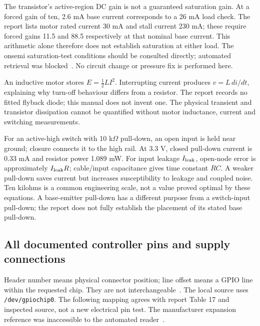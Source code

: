 The transistor's active-region DC gain is not a guaranteed saturation gain.
At a forced gain of ten, 2.6 mA base current corresponds to a 26 mA load
check. The report lists motor rated current 30 mA and stall current 230 mA;
these require forced gains 11.5 and 88.5 respectively at that nominal base
current. This arithmetic alone therefore does not establish saturation at
either load. The onsemi saturation-test conditions should be consulted
directly; automated retrieval was blocked~\cite{bc337data}. No circuit
change or pressure fix is performed here.

An inductive motor stores $E=\tfrac12LI^2$. Interrupting current produces
$v=L\,di/dt$, explaining why turn-off behaviour differs from a resistor.
The report records no fitted flyback diode; this manual does not invent one.
The physical transient and transistor dissipation cannot be quantified without
motor inductance, current and switching measurements.

For an active-high switch with 10 k$\Omega$ pull-down, an open input is
held near ground; closure connects it to the high rail. At 3.3 V, closed
pull-down current is 0.33 mA and resistor power 1.089 mW.
For input leakage $I_{\rm leak}$, open-node error is approximately
$I_{\rm leak}R$; cable/input capacitance gives time constant $RC$.
A weaker pull-down saves current but increases susceptibility to leakage
and coupled noise. Ten kilohms is a common engineering scale, not a value
proved optimal by these equations. A base-emitter pull-down has a different
purpose from a switch-input pull-down; the report does not fully establish
the placement of its stated base pull-down.

\subsection{All documented controller pins and supply connections}
Header number means physical connector position; line offset means a GPIO
line within the requested chip. They are not interchangeable~\cite{kernelgpio}.
The local source uses \texttt{/dev/gpiochip0}. The following mapping agrees
with report Table 17 and inspected source, not a new electrical pin test.
The manufacturer expansion reference was inaccessible to the automated
reader~\cite{odroidgpio}.

